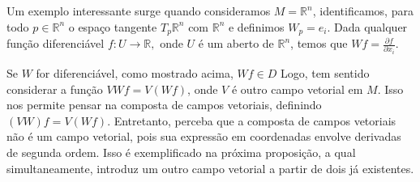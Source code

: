 Um exemplo interessante surge quando consideramos $M=\mathbb{R}^{n}$, identificamos, para todo $p \in \mathbb{R}^{n}$ o espaço tangente $T_{p}\mathbb{R}^{n}$ com $\mathbb{R}^{n}$ e definimos $W_{p}=e_{i}$. Dada qualquer função diferenciável $f:U\to \mathbb{R},$ onde $U$ é um aberto de $\mathbb{R}^{n}$, temos que $Wf=\frac{\partial f}{\partial x_{i}}$.

Se $W$ for diferenciável, como mostrado acima, $Wf \in D$ Logo, tem sentido considerar a
função $VWf = V (Wf)$, onde $V$ é outro campo vetorial em $M$. Isso nos permite pensar na
composta de campos vetoriais, definindo $(VW)f = V (Wf)$. Entretanto, perceba que a
composta de campos vetoriais não é um campo vetorial, pois sua expressão em
coordenadas envolve derivadas de segunda ordem. Isso é exemplificado na próxima
proposição, a qual simultaneamente, introduz um outro campo vetorial a partir de dois já
existentes.
